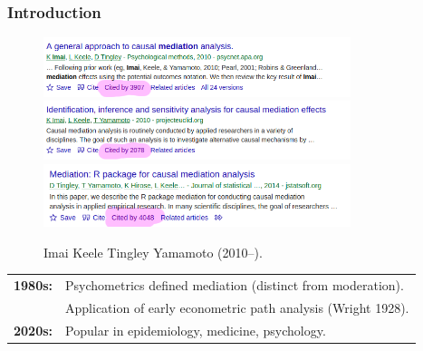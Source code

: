 \documentclass[dvipsnames]{beamer} %
\begin{document}
\begin{frame}[noframenumbering]
    \frametitle{Introduction}
    \vskip-0.5cm
    \begin{figure}
        \centering
        \singlespacing
        \caption{Imai Keele Tingley Yamamoto (2010--).}
        \vskip-0.25cm
        \includegraphics[width=0.8\textwidth]{presentation-files/headlines/imai-2010b.png}
        \includegraphics[width=0.8\textwidth]{presentation-files/headlines/imai-2010a.png}
        \includegraphics[width=0.8\textwidth]{presentation-files/headlines/tingley-2014.png}
    \end{figure}
    \begin{tabular}{l l}
        \textbf{1980s:}
        & Psychometrics defined mediation (distinct from moderation). \\
        & Application of early econometric path analysis (Wright 1928). \\
        \textbf{2020s:}
        & Popular in epidemiology, medicine, psychology.
    \end{tabular}
\end{frame}%
\end{document}
